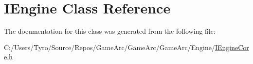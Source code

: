 \hypertarget{class_i_engine}{}\section{I\+Engine Class Reference}
\label{class_i_engine}


The documentation for this class was generated from the following file\+:\begin{DoxyCompactItemize}
\item 
C\+:/\+Users/\+Tyro/\+Source/\+Repos/\+Game\+Arc/\+Game\+Arc/\+Game\+Arc/\+Engine/\mbox{\hyperlink{_i_engine_core_8h}{I\+Engine\+Core.\+h}}\end{DoxyCompactItemize}
